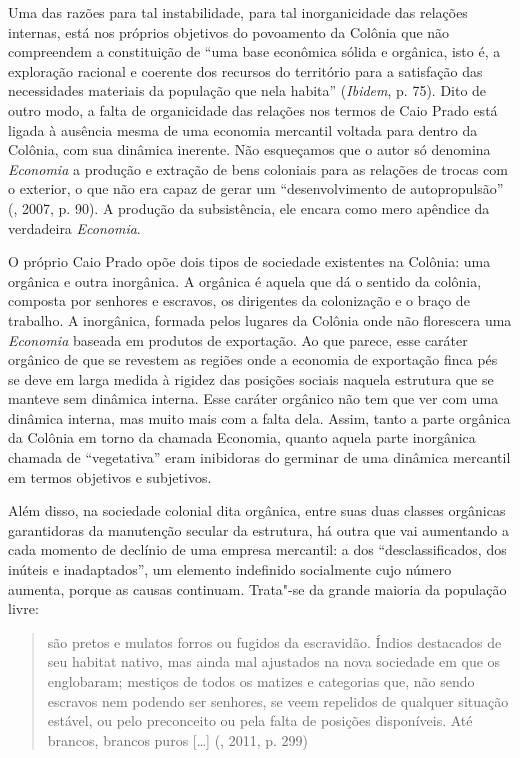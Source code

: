 Uma das razões para tal instabilidade, para tal inorganicidade das
relações internas, está nos próprios objetivos do povoamento da Colônia
que não compreendem a constituição de ``uma base econômica sólida e
orgânica, isto é, a exploração racional e coerente dos recursos do
território para a satisfação das necessidades materiais da população que
nela habita'' (\emph{Ibidem}, p. 75). Dito de outro modo, a falta
de organicidade das relações nos termos de Caio Prado está ligada à
ausência mesma de uma economia mercantil voltada para dentro da Colônia,
com sua dinâmica inerente. Não esqueçamos que o autor só denomina
\emph{Economia} a produção e extração de bens coloniais para as relações
de trocas com o exterior, o que não era capaz de gerar um
``desenvolvimento de autopropulsão'' (, 2007, p. 90). A produção
da subsistência, ele encara como mero apêndice da verdadeira
\emph{Economia}.

O próprio Caio Prado opõe dois tipos de sociedade existentes na Colônia:
uma orgânica e outra inorgânica. A orgânica é aquela que dá o sentido da
colônia, composta por senhores e escravos, os dirigentes da colonização
e o braço de trabalho. A inorgânica, formada pelos lugares da Colônia
onde não florescera uma \emph{Economia} baseada em produtos de
exportação. Ao que parece, esse caráter orgânico de que se revestem as
regiões onde a economia de exportação finca pés se deve em larga medida
à rigidez das posições sociais naquela estrutura que se manteve sem
dinâmica interna. Esse caráter orgânico não tem que ver com uma dinâmica
interna, mas muito mais com a falta dela. Assim, tanto a parte orgânica
da Colônia em torno da chamada Economia, quanto aquela parte inorgânica
chamada de ``vegetativa'' eram inibidoras do germinar de uma dinâmica
mercantil em termos objetivos e subjetivos.

Além disso, na sociedade colonial dita orgânica, entre suas duas classes
orgânicas garantidoras da manutenção secular da estrutura, há outra que
vai aumentando a cada momento de declínio de uma empresa mercantil: a
dos ``desclassificados, dos inúteis e inadaptados'', um elemento
indefinido socialmente cujo número aumenta, porque as causas continuam.
Trata"-se da grande maioria da população livre:

\begin{quote}
são pretos e mulatos forros ou fugidos da escravidão. Índios destacados
de seu habitat nativo, mas ainda mal ajustados na nova sociedade em que
os englobaram; mestiços de todos os matizes e categorias que, não sendo
escravos nem podendo ser senhores, se veem repelidos de qualquer
situação estável, ou pelo preconceito ou pela falta de posições
disponíveis. Até brancos, brancos puros [\ldots{}] (, 2011, p.
299)
\end{quote}

